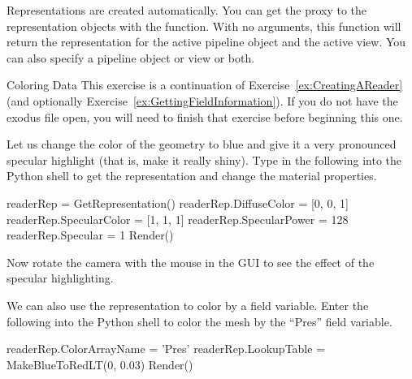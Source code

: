 Representations are created automatically.  You can get the proxy to the
representation objects with the  function.  With
no arguments, this function will return the representation for the active
pipeline object and the active view.  You can also specify a pipeline
object or view or both.

\begin{exercise}{Coloring Data}
  \label{ex:ColoringData}%
  This exercise is a continuation of Exercise~\ref{ex:CreatingAReader} (and
  optionally Exercise~\ref{ex:GettingFieldInformation}).  If you do not
  have the exodus file open, you will need to finish that exercise before
  beginning this one.

  Let us change the color of the geometry to blue and give it a very
  pronounced specular highlight (that is, make it really shiny).  Type in
  the following into the Python shell to get the representation and change
  the material properties.

  \begin{python}
readerRep = GetRepresentation()
readerRep.DiffuseColor = [0, 0, 1]
readerRep.SpecularColor = [1, 1, 1]
readerRep.SpecularPower = 128
readerRep.Specular = 1
Render()
  \end{python}

  Now rotate the camera with the mouse in the GUI to see the effect of the
  specular highlighting.

  We can also use the representation to color by a field variable.  Enter
  the following into the Python shell to color the mesh by the ``Pres''
  field variable.

  \begin{python}
readerRep.ColorArrayName = 'Pres'
readerRep.LookupTable = MakeBlueToRedLT(0, 0.03)
Render()
  \end{python}
\end{exercise}

